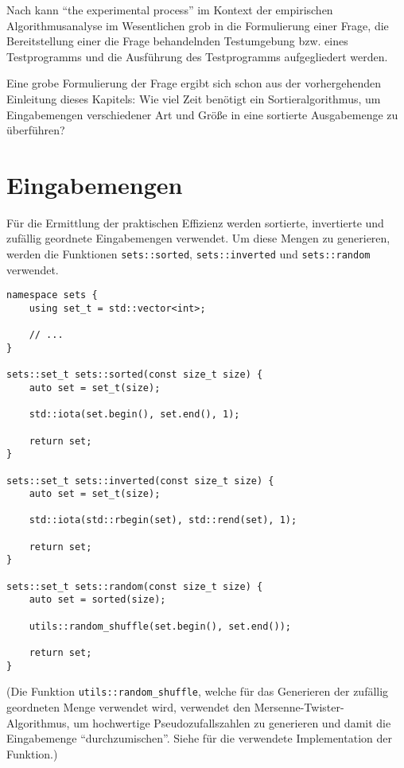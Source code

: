 Nach \cite[10]{mcg2012} kann \enquote{the experimental process} im Kontext der empirischen Algorithmusanalyse im Wesentlichen grob in die Formulierung einer Frage, die Bereitstellung einer die Frage behandelnden Testumgebung bzw. eines Testprogramms und die Ausführung des Testprogramms aufgegliedert werden.

Eine grobe Formulierung der Frage ergibt sich schon aus der vorhergehenden Einleitung dieses Kapitels: Wie viel Zeit benötigt ein Sortieralgorithmus, um Eingabemengen verschiedener Art und Größe in eine sortierte Ausgabemenge zu überführen?

\section{Eingabemengen}
\label{sec:runtime-inputs}

Für die Ermittlung der praktischen Effizienz werden sortierte, invertierte und zufällig geordnete Eingabemengen verwendet. Um diese Mengen zu generieren, werden die Funktionen \lstinline{sets::sorted}, \lstinline{sets::inverted} und \lstinline{sets::random} verwendet.

\begin{lstlisting}[caption={Funktionen, welche Mengen der verwendeten Eingabemengearten generieren.}]
namespace sets {
    using set_t = std::vector<int>;

    // ...
}

sets::set_t sets::sorted(const size_t size) {
	auto set = set_t(size);

	std::iota(set.begin(), set.end(), 1);

	return set;
}

sets::set_t sets::inverted(const size_t size) {
	auto set = set_t(size);

	std::iota(std::rbegin(set), std::rend(set), 1);

	return set;
}

sets::set_t sets::random(const size_t size) {
	auto set = sorted(size);

	utils::random_shuffle(set.begin(), set.end());

	return set;
}
\end{lstlisting}

(Die Funktion \lstinline{utils::random_shuffle}, welche für das Generieren der zufällig geordneten Menge verwendet wird, verwendet den Mersenne-Twister-Algorithmus, um hochwertige Pseudozufallszahlen zu generieren und damit die Eingabemenge \enquote{durchzumischen}. Siehe  für die verwendete Implementation der Funktion.)

